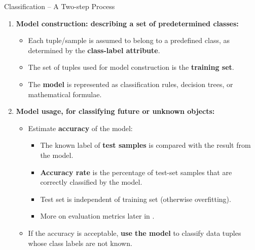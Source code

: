 \begin{frame}{Classification -- A Two-step Process}
	\begin{enumerate}
		\item \textbf{Model construction: describing a set of predetermined classes:}
		      \begin{itemize}
			      \item Each tuple/sample is assumed to belong to a predefined class, as determined by the \textbf{\color{airforceblue}class-label attribute}.
			      \item The set of tuples used for model construction is the \textbf{\color{airforceblue}training set}.
			      \item The \textbf{\color{airforceblue}model} is represented as classification rules, decision trees, or mathematical formulae.
		      \end{itemize}
		\item \textbf{Model usage, for classifying future or unknown objects:}
		      \begin{itemize}
			      \item Estimate \textbf{\color{airforceblue}accuracy} of the model:
			            \begin{itemize}
				            \item The known label of \textbf{test samples} is compared with the result from the model.
				            \item \textbf{Accuracy rate} is the percentage of test-set samples that are correctly classified by the model.
				            \item Test set is independent of training set (otherwise overfitting).
				            \item More on evaluation metrics later in \hyperlink{section:evaluation}{}.
			            \end{itemize}
			      \item If the accuracy is acceptable, \textbf{\color{airforceblue}use the model} to classify data tuples whose class labels are not known.
		      \end{itemize}
	\end{enumerate}
\end{frame}

